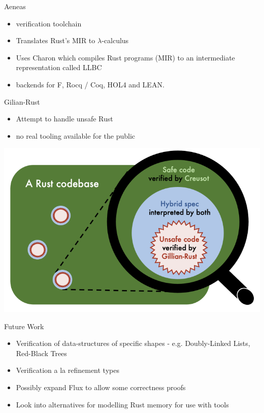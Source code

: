 \documentclass{beamer}
\begin{document}
\begin{frame} {Aeneas}

\begin{itemize}
\item 
 verification toolchain
\item
Translates Rust’s MIR to $\lambda$-calculus
\item Uses Charon which compiles Rust programs (MIR) to an intermediate representation called LLBC
\item
backends for F\*, Rocq / Coq, HOL4 and LEAN.
\end{itemize}
\end{frame} 



\begin{frame} {Gilian-Rust}

\begin{itemize}
\item 
Attempt to handle unsafe Rust
\item 
no real tooling available for the public
\end{itemize}


\begin{center}
\includegraphics[scale=0.2]{pictures/gilian-creusot}
\end{center}

\end{frame} 





\begin{frame} {Future Work}

\begin{itemize}
\item Verification of data-structures of specific shapes - e.g. Doubly-Linked Lists, Red-Black Trees
\item Verification a la refinement types
\item Possibly expand Flux to allow some correctness proofs
\item Look into alternatives for modelling Rust memory for use with tools
\end{itemize}

\end{frame}
\end{document}
